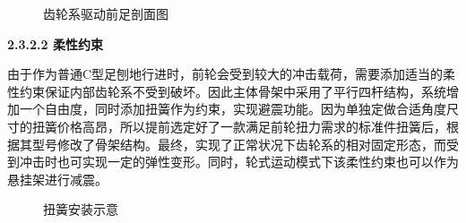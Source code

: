 \documentclass[12pt]{article}
\begin{document}
\begin{CJK}{UTF8}{song}
\begin{figure}[H]
{%
}
\quad
{}
\quad
\caption{齿轮系驱动前足剖面图}
\end{figure}
\textbf{2.3.2.2	柔性约束}\par
由于作为普通C型足刨地行进时，前轮会受到较大的冲击载荷，需要添加适当的柔性约束保证内部齿轮系不受到破坏。因此主体骨架中采用了平行四杆结构，系统增加一个自由度，同时添加扭簧作为约束，实现避震功能。因为单独定做合适角度尺寸的扭簧价格高昂，所以提前选定好了一款满足前轮扭力需求的标准件扭簧后，根据其型号修改了骨架结构。最终，实现了正常状况下齿轮系的相对固定形态，而受到冲击时也可实现一定的弹性变形。同时，轮式运动模式下该柔性约束也可以作为悬挂架进行减震。
 \begin{figure}[H]
{}
\quad
{}
\quad
\caption{扭簧安装示意}
\end{figure}


\end{CJK}
\end{document}
